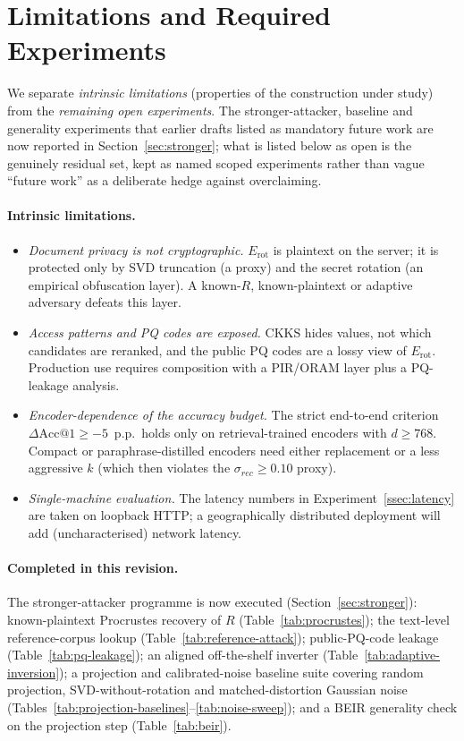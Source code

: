 \documentclass[11pt,a4paper]{article}
\begin{document}
\section{Limitations and Required Experiments}\label{sec:limits}

We separate \emph{intrinsic limitations} (properties of the construction
under study) from the \emph{remaining open experiments}. The
stronger-attacker, baseline and generality experiments that earlier drafts
listed as mandatory future work are now reported in
Section~\ref{sec:stronger}; what is listed below as open is the genuinely
residual set, kept as named scoped experiments rather than vague
``future work'' as a deliberate hedge against overclaiming.

\paragraph{Intrinsic limitations.}
\begin{itemize}[leftmargin=18pt,topsep=2pt,itemsep=2pt]
\item \emph{Document privacy is not cryptographic.} $E_{\mathrm{rot}}$
is plaintext on the server; it is protected only by SVD truncation (a
proxy) and the secret rotation (an empirical obfuscation layer). A
known-$R$, known-plaintext or adaptive adversary defeats this layer.
\item \emph{Access patterns and PQ codes are exposed.} CKKS hides values,
not which candidates are reranked, and the public PQ codes are a lossy
view of $E_{\mathrm{rot}}$. Production use requires composition with a
PIR/ORAM layer plus a PQ-leakage analysis.
\item \emph{Encoder-dependence of the accuracy budget.} The strict
end-to-end criterion $\Delta\mathrm{Acc@1} \geq -5$~p.p.\ holds only
on retrieval-trained encoders with $d \geq 768$. Compact or
paraphrase-distilled encoders need either replacement or a less
aggressive $k$ (which then violates the $\sigma_{rec} \geq 0.10$ proxy).
\item \emph{Single-machine evaluation.} The latency numbers in
Experiment~\ref{ssec:latency} are taken on loopback HTTP; a
geographically distributed deployment will add (uncharacterised)
network latency.
\end{itemize}

\paragraph{Completed in this revision.} The stronger-attacker programme is
now executed (Section~\ref{sec:stronger}): known-plaintext Procrustes
recovery of $R$ (Table~\ref{tab:procrustes}); the text-level
reference-corpus lookup (Table~\ref{tab:reference-attack}); public-PQ-code
leakage (Table~\ref{tab:pq-leakage}); an aligned off-the-shelf inverter
(Table~\ref{tab:adaptive-inversion}); a projection and calibrated-noise
baseline suite covering random projection, SVD-without-rotation and
matched-distortion Gaussian noise
(Tables~\ref{tab:projection-baselines}--\ref{tab:noise-sweep}); and a BEIR
generality check on the projection step (Table~\ref{tab:beir}).
\end{document}
